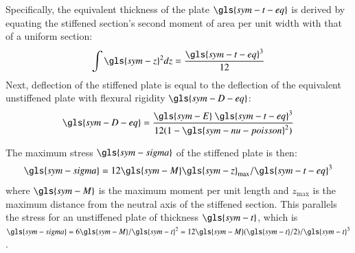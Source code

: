 Specifically, the equivalent thickness of the plate $\gls{sym-t-eq}$ is derived by equating the stiffened section's second moment of area per unit width with that of a uniform section:
\begin{equation}
    \int \gls{sym-z}^2dz = \frac{\gls{sym-t-eq}^3}{12}
\end{equation}
Next, deflection of the stiffened plate is equal to the deflection of the equivalent unstiffened plate with flexural rigidity $\gls{sym-D-eq}$:
\begin{equation}
    \gls{sym-D-eq} = \frac{\gls{sym-E}~  \gls{sym-t-eq}^3}{12(1-\gls{sym-nu-poisson}^2)}
\end{equation}

The maximum stress $\gls{sym-sigma}$ of the stiffened plate is then:
\begin{equation}\label{eq:plate-stress}
    \gls{sym-sigma}= 12\gls{sym-M} \gls{sym-z}_{\text{max}}/\gls{sym-t-eq}^3
\end{equation}
where $\gls{sym-M}$ is the maximum moment per unit length and $z_{\text{max}}$ is the maximum distance from the neutral axis of the stiffened section.
This parallels the stress for an unstiffened plate of thickness $\gls{sym-t}$, which is $\gls{sym-sigma}=6\gls{sym-M}/\gls{sym-t}^2 = 12 \gls{sym-M}(\gls{sym-t}/2)/\gls{sym-t}^3$.

